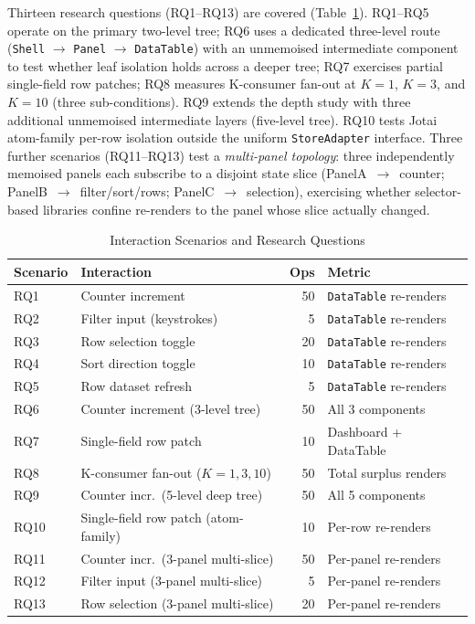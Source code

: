 \documentclass[conference]{IEEEtran}
\newcommand{\code}[1]{\texttt{\small #1}}
\begin{document}
Thirteen research questions (RQ1--RQ13) are covered
(Table~\ref{tab:scenarios}). RQ1--RQ5 operate on the primary two-level
tree; RQ6 uses a dedicated three-level route (\code{Shell} $\to$
\code{Panel} $\to$ \code{DataTable}) with an unmemoised intermediate
component to test whether leaf isolation holds across a deeper tree; RQ7
exercises partial single-field row patches; RQ8 measures K-consumer
fan-out at $K{=}1$, $K{=}3$, and $K{=}10$ (three sub-conditions).  RQ9
extends the depth study with three additional unmemoised intermediate
layers (five-level tree). RQ10 tests Jotai atom-family per-row
isolation outside the uniform \code{StoreAdapter} interface.  Three
further scenarios (RQ11--RQ13) test a \emph{multi-panel topology}:
three independently memoised panels each subscribe to a disjoint state
slice (PanelA~$\to$~counter; PanelB~$\to$~filter/sort/rows;
PanelC~$\to$~selection), exercising whether selector-based libraries
confine re-renders to the panel whose slice actually changed.

\begin{table}[tb]
\caption{Interaction Scenarios and Research Questions}
\label{tab:scenarios}
\begin{center}
\scriptsize
\setlength{\tabcolsep}{4pt}
\begin{tabular}{llrl}
\toprule
\textbf{Scenario} & \textbf{Interaction}         & \textbf{Ops} & \textbf{Metric} \\
\midrule
RQ1 & Counter increment               & 50  & \code{DataTable} re-renders \\
RQ2 & Filter input (keystrokes)        & 5   & \code{DataTable} re-renders \\
RQ3 & Row selection toggle             & 20  & \code{DataTable} re-renders \\
RQ4 & Sort direction toggle            & 10  & \code{DataTable} re-renders \\
RQ5 & Row dataset refresh              & 5   & \code{DataTable} re-renders \\
RQ6 & Counter increment (3-level tree) & 50  & All 3 components \\
RQ7 & Single-field row patch           & 10  & Dashboard + DataTable \\
RQ8 & K-consumer fan-out ($K{=}1,3,10$) & 50  & Total surplus renders \\
RQ9 & Counter incr.\ (5-level deep tree) & 50 & All 5 components \\
RQ10 & Single-field row patch (atom-family) & 10 & Per-row re-renders \\
RQ11 & Counter incr.\ (3-panel multi-slice) & 50 & Per-panel re-renders \\
RQ12 & Filter input (3-panel multi-slice)   & 5  & Per-panel re-renders \\
RQ13 & Row selection (3-panel multi-slice)  & 20 & Per-panel re-renders \\
\bottomrule
\end{tabular}
\end{center}
\end{table}
\end{document}
